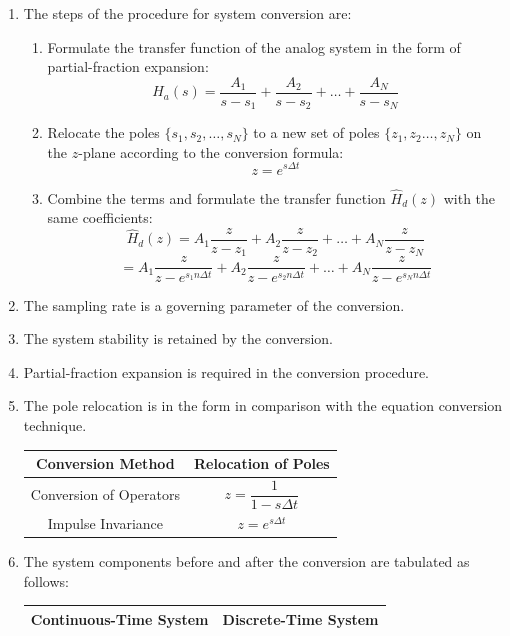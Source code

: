 \documentclass{article}
\begin{document}
\begin{enumerate}
    \item The steps of the procedure for system conversion are:
    \begin{enumerate}[label=\alph*.]
        \item Formulate the transfer function of the analog system in the form of partial-fraction expansion:
        \[
        H_a(s)=\frac{A_1}{s-s_1}+\frac{A_2}{s-s_2}+\dots+\frac{A_N}{s-s_N}
        \]
        \item Relocate the poles \(\{s_1,s_2,\dots,s_N\}\) to a new set of poles \(\{z_1,z_2\dots,z_N\}\) on the \(z\)-plane according to the conversion formula:
        \[
        z=e^{s\Delta t}
        \]
        \item Combine the terms and formulate the transfer function \(\hat{H}_d(z)\) with the same coefficients:
        \[
        \hat{H}_d(z)=A_1\frac{z}{z-z_1}+A_2\frac{z}{z-z_2}+\dots+A_N\frac{z}{z-z_N}
        \]
        \[
        =A_1\frac{z}{z-e^{s_1n\Delta t}}+A_2\frac{z}{z-e^{s_2n\Delta t}}+\dots+A_N\frac{z}{z-e^{s_Nn\Delta t}}
        \]
    \end{enumerate}
    \item The sampling rate is a governing parameter of the conversion.
    \item The system stability is retained by the conversion.
    \item Partial-fraction expansion is required in the conversion procedure.
    \item The pole relocation is in the form in comparison with the equation conversion technique.
    \begin{table}[h]
    \centering
    \begin{tabular}{|c|c|}
    \hline
    \textbf{Conversion Method} & \textbf{Relocation of Poles} \\ \hline
    Conversion of Operators & 
    $z = \dfrac{1}{1 - s\Delta t}$ \\ \hline
    Impulse Invariance & 
    $z = e^{s\Delta t}$ \\ \hline
    \end{tabular}
    \end{table}
    \item The system components before and after the conversion are tabulated as follows:
    \begin{table}[h]
\centering
\begin{tabular}{|c|c|}
\hline
\textbf{Continuous-Time System} & \textbf{Discrete-Time System} \\ \hline


\end{tabular}
\end{table}
\end{enumerate}
\end{document}
